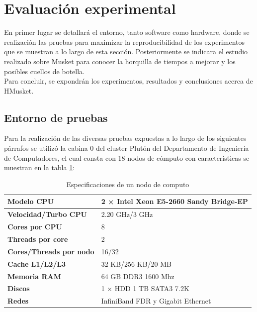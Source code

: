 \documentclass[conference]{IEEEtran}
\begin{document}
\section{Evaluación experimental}
En primer lugar se detallará el entorno, tanto software como hardware, donde se realización las pruebas para maximizar la reproducibilidad de los experimentos que se muestran a lo largo de esta sección. Posteriormente se indicara el estudio realizado sobre Musket para conocer la horquilla de tiempos a mejorar y los posibles cuellos de botella.\\
Para concluir, se expondrán los experimentos, resultados y conclusiones acerca de HMusket.

\subsection{Entorno de pruebas}
Para la realización de las diversas pruebas expuestas a lo largo de los siguientes párrafos se utilizó la cabina 0 del cluster Plutón del Departamento de Ingeniería de Computadores, el cual consta con 18 nodos de cómputo con características se muestran en la tabla \ref{node_especification}:\\ 

\begin{table}[t]
	\begin{center}
		\begin{tabular}{|l|l|}
			\hline
			\textbf{Modelo CPU} & 2 × Intel Xeon E5-2660 Sandy Bridge-EP \\ \hline
			\textbf{Velocidad/Turbo CPU} & 2.20 GHz/3 GHz \\ \hline
			\textbf{Cores por CPU} & 8 \\ \hline
			\textbf{Threads por core} & 2 \\ \hline
			\textbf{Cores/Threads por nodo} & 16/32 \\ \hline
			\textbf{Cache L1/L2/L3} & 32 KB/256 KB/20 MB \\ \hline
			\textbf{Memoria RAM} & 64 GB DDR3 1600 Mhz \\ \hline
			\textbf{Discos} & 1 × HDD 1 TB SATA3 7.2K \\ \hline
			\textbf{Redes} & InfiniBand FDR y Gigabit Ethernet \\ \hline
		\end{tabular}
		\caption{Especificaciones de un nodo de computo}
		\label{node_especification}
	\end{center}
\end{table}
\end{document}
